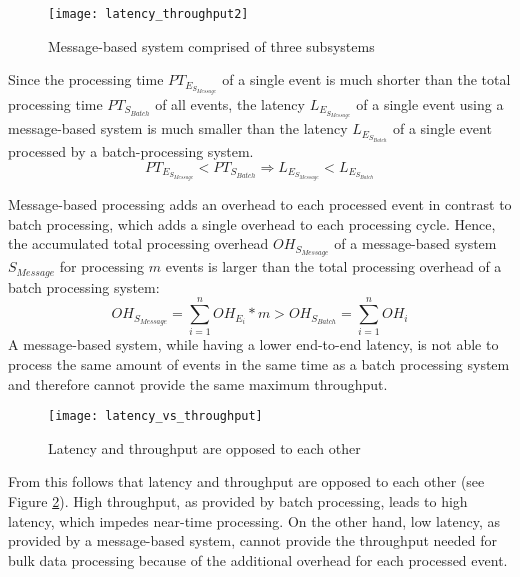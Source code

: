 \begin{figure}[h!]
	\centering
	\texttt{[image: latency\_throughput2]}
	\caption{Message-based system comprised of three subsystems}
	\label{fig:message_based_latency}
\end{figure}

Since the processing time $PT_{E_{S_{Message}}}$ of a single event is much shorter than the total processing time $PT_{S_{Batch}}$ of all events, the latency $L_{E_{S_{Message}}}$ of a single event using a message-based system is much smaller than the latency $L_{E_{S_{Batch}}}$ of a single event processed by a batch-processing system.
\begin{displaymath}
PT_{E_{S_{Message}}} < PT_{S_{Batch}} \Rightarrow L_{E_{S_{Message}}} < L_{E_{S_{Batch}}}
\end{displaymath}

Message-based processing adds an overhead to each processed event in contrast to batch processing, which adds a single overhead to each processing cycle. Hence, the accumulated total processing overhead $OH_{S_{Message}}$ of a message-based system $S_{Message}$ for processing $m$ events is larger than the total processing overhead of a batch processing system:
\begin{displaymath}
OH_{S_{Message}} = \sum_{i=1}^n OH_{E_i} * m > OH_{S_{Batch}} = \sum_{i=1}^n OH_i
\end{displaymath}
A message-based system, while having a lower end-to-end latency, is not able to process the same amount of events in the same time as a batch processing system and therefore cannot provide the same maximum throughput.

\begin{figure}[h!]
	\centering
	\texttt{[image: latency\_vs\_throughput]}
	\caption{Latency and throughput are opposed to each other}
	\label{fig:latency_vs_throughput}
\end{figure}

From this follows that latency and throughput are opposed to each other (see Figure \ref{fig:latency_vs_throughput}). High throughput, as provided by batch processing, leads to high latency, which impedes near-time processing. On the other hand, low latency, as provided by a message-based system, cannot provide the throughput needed for bulk data processing because of the additional overhead for each processed event.